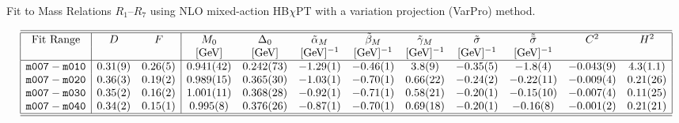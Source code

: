 \documentclass[twocolumn,nofootinbib,prd,aps,superscriptaddress,tightenlines]{revtex4}
\def\s{\sigma}
\def\a{\alpha}
\def\b{\beta}
\def\g{\gamma}
\def\ufont#1{\text{#1}}
\begin{document}
\begin{table*}
\caption{\label{table:NLOMAR1R7} Fit to Mass Relations $R_1$--$R_7$ using NLO mixed-action HB$\chi$PT with a variation projection (VarPro) method.}
\begin{eqnarray*}
\begin{array}{|c|cc|ccccccccc|}
\hline\hline
\textrm{Fit Range}& D& F& M_0& \Delta_0& \tilde{\a}_M& \tilde{\b}_M& \tilde{\g}_M& \tilde{\s}& \tilde{\bar{\s}}& C^2& H^2\\
&&& [\ufont{GeV}]& [\ufont{GeV}]& [\ufont{GeV}] ^{-1}& [\ufont{GeV}] ^{-1}& [\ufont{GeV}]^{-1}& [\ufont{GeV}]^{-1} & [\ufont{GeV}] ^{-1}&& \\
\hline
\texttt{m007}-\texttt{m010}& 
	 0.31(9)& 0.26(5)& 0.941(42)& 0.242(73)& -1.29(1)& -0.46(1)& 3.8(9)& -0.35(5)& -1.8(4)& -0.043(9)& 4.3(1.1)\\
\texttt{m007}-\texttt{m020}& 
	0.36(3)& 0.19(2)& 0.989(15)& 0.365(30)& -1.03(1)& -0.70(1)& 0.66(22)& -0.24(2)& -0.22(11)& -0.009(4)& 0.21(26)\\
\texttt{m007}-\texttt{m030}& 
	0.35(2)& 0.16(2)& 1.001(11)& 0.368(28)& -0.92(1)& -0.71(1)& 0.58(21)& -0.20(1)& -0.15(10)& -0.007(4)& 0.11(25) \\
\texttt{m007}-\texttt{m040}& 
	 0.34(2)& 0.15(1)& 0.995(8)& 0.376(26)& -0.87(1)& -0.70(1)& 0.69(18)& -0.20(1)& -0.16(8)& -0.001(2)& 0.21(21)\\
\hline\hline
\end{array}
\end{eqnarray*}
\end{table*}
\end{document}

